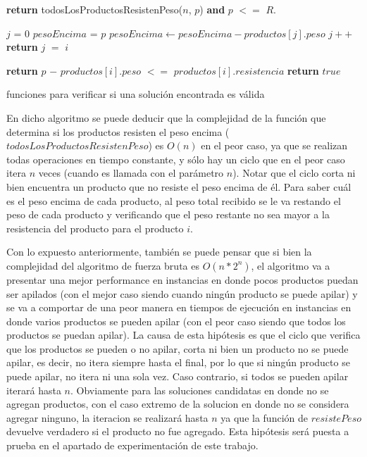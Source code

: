 \documentclass[10pt,a4paper]{article}
\begin{document}
\begin{algorithm}
\begin{algorithmic}[1]
    \State \textbf{return} todosLosProductosResistenPeso($n$, $p$) \textbf{and} $p$ $<=$ $R$.
\EndFunction

    \State $j$ = $0$
    \State $pesoEncima$ = $p$
      \label{linea:cicloIteracionProductos}
            \State $pesoEncima \gets pesoEncima - productos[j].peso$
        \EndIf
        \State $j++$
    \EndWhile
    \State \textbf{return} $j$ $=$ $i$
\EndFunction

            \State \textbf{return} $p$ $-$ $productos[i].peso$ $<=$ $productos[i].resistencia$
        \EndIf 
    \State \textbf{return} $true$
\EndFunction

\end{algorithmic}
\caption{funciones para verificar si una solución encontrada es válida}
\label{alg:funciones}
\end{algorithm}

En dicho algoritmo se puede deducir que la complejidad de la función que determina si los productos resisten el peso encima ($todosLosProductosResistenPeso$) es $O(n)$ en el peor caso, ya que se realizan todas operaciones en tiempo constante, y sólo hay un ciclo que en el peor caso itera $n$ veces (cuando es llamada con el parámetro $n$). Notar que el ciclo corta ni bien encuentra un producto que no resiste el peso encima de él. Para saber cuál es el peso encima de cada producto, al peso total recibido se le va restando el peso de cada producto y verificando que el peso restante no sea mayor a la resistencia del producto para el producto $i$. 

Con lo expuesto anteriormente, también se puede pensar que si bien la complejidad del algoritmo de fuerza bruta es $O(n*2^n)$, el algoritmo va a presentar una mejor performance en instancias en donde pocos productos puedan ser apilados (con el mejor caso siendo cuando ningún producto se puede apilar) y se va a comportar de una peor manera en tiempos de ejecución en instancias en donde varios productos se pueden apilar (con el peor caso siendo que todos los productos se puedan apilar). La causa de esta hipótesis es que el ciclo que verifica que los productos se pueden o no apilar, corta ni bien un producto no se puede apilar, es decir, no itera siempre hasta el final, por lo que si ningún producto se puede apilar, no itera ni una sola vez. Caso contrario, si todos se pueden apilar iterará hasta $n$. Obviamente para las soluciones candidatas en donde no se agregan productos, con el caso extremo de la solucion en donde no se considera agregar ninguno, la iteracion se realizará hasta $n$ ya que la función de $resistePeso$ devuelve verdadero si el producto no fue agregado. Esta hipótesis será puesta a prueba en el apartado de experimentación de este trabajo.
\end{document}
